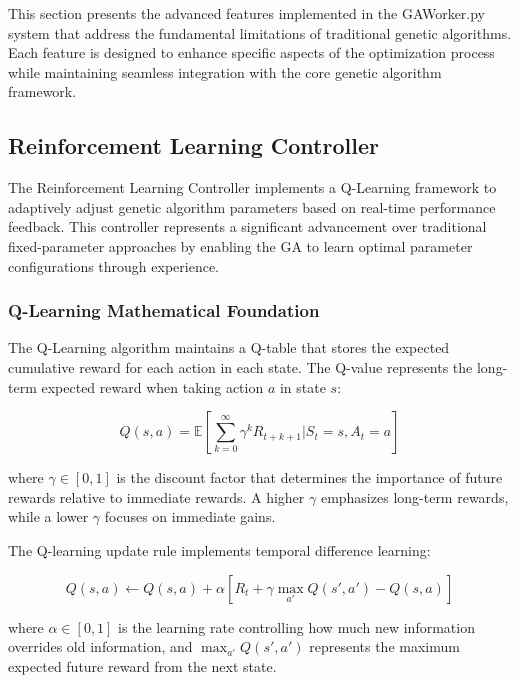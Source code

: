 \documentclass[12pt,a4paper]{article}
\begin{document}
This section presents the advanced features implemented in the GAWorker.py system that address the fundamental limitations of traditional genetic algorithms. Each feature is designed to enhance specific aspects of the optimization process while maintaining seamless integration with the core genetic algorithm framework.

\subsection{Reinforcement Learning Controller}

The Reinforcement Learning Controller implements a Q-Learning framework to adaptively adjust genetic algorithm parameters based on real-time performance feedback. This controller represents a significant advancement over traditional fixed-parameter approaches by enabling the GA to learn optimal parameter configurations through experience.

\subsubsection{Q-Learning Mathematical Foundation}

The Q-Learning algorithm maintains a Q-table that stores the expected cumulative reward for each action in each state. The Q-value represents the long-term expected reward when taking action $a$ in state $s$:

\begin{equation}\label{Eq.q_table_definition}
Q(s, a) = \mathbb{E}\left[\sum_{k=0}^{\infty} \gamma^k R_{t+k+1} | S_t = s, A_t = a\right]
\end{equation}

where $\gamma \in [0,1]$ is the discount factor that determines the importance of future rewards relative to immediate rewards. A higher $\gamma$ emphasizes long-term rewards, while a lower $\gamma$ focuses on immediate gains.

The Q-learning update rule implements temporal difference learning:

\begin{equation}\label{Eq.q_learning_update}
Q(s, a) \leftarrow Q(s, a) + \alpha \left[ R_t + \gamma \max_{a'} Q(s', a') - Q(s, a) \right]
\end{equation}

where $\alpha \in [0,1]$ is the learning rate controlling how much new information overrides old information, and $\max_{a'} Q(s', a')$ represents the maximum expected future reward from the next state.
\end{document}
